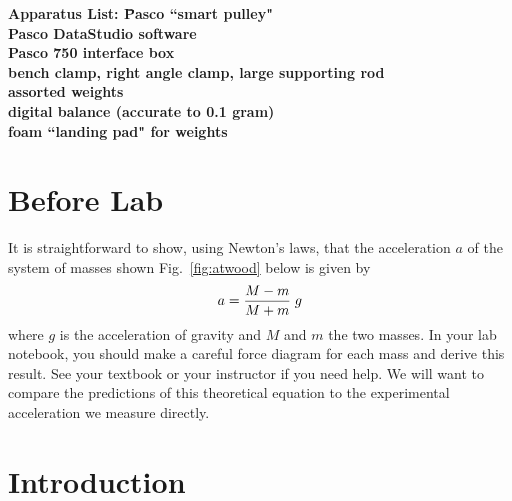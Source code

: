 \newexp


\begin{tabbing}
\bf{Apparatus List:} \hspace{12pt} \=  Pasco ``smart pulley" \\
	\> Pasco DataStudio software \\
	\> Pasco 750 interface box \\
	\> bench clamp, right angle clamp, large supporting rod \\
	\> assorted weights \\
	\> digital balance (accurate to 0.1 gram) \\
	\> foam ``landing pad" for weights \\
\end{tabbing}

\section*{Before Lab}

It is straightforward to show, using Newton's laws, that the
acceleration $a$ of the system of masses shown Fig.~\ref{fig:atwood}
below is given by
\[
 a = {{M - m} \over {M + m}}\; g
\]
where $g$ is the
acceleration of gravity and $M$ and $m$ the two masses.
In your lab notebook, you should make a
careful force diagram for each mass and derive this result.
See your textbook or your instructor if you need help.  We will want
to compare the predictions of this theoretical
equation to the experimental acceleration we measure directly.


\section*{Introduction}

